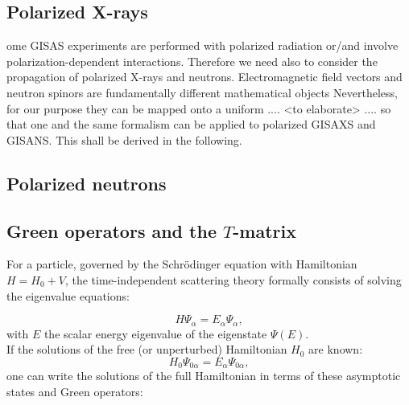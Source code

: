 \subsection{Polarized X-rays}


ome GISAS experiments are performed with polarized radiation
or/and involve polarization-dependent interactions.
Therefore we need also to consider
the propagation of polarized X-rays and neutrons.
Electromagnetic field vectors and neutron spinors
are fundamentally different mathematical objects
Nevertheless, for our purpose they can be
mapped onto a uniform .... <to elaborate> ....
so that one and the same formalism can be applied
to polarized GISAXS and GISANS.
This shall be derived in the following.


\subsection{Polarized neutrons}



\subsection{Green operators and the $T$-matrix}
  \label{sec:BornT}

For a particle, governed by the Schr\"odinger equation with Hamiltonian $H = H_0 + V$, the time-independent scattering theory formally consists of solving the eigenvalue equations:

\begin{equation*}
  H\Psi_\alpha = E_\alpha\Psi_\alpha,
\end{equation*}
with $E$ the scalar energy eigenvalue of the eigenstate $\Psi(E)$.\\
If the solutions of the free (or unperturbed) Hamiltonian $H_0$ are known:
\begin{equation*}
  H_0\Psi_{0\alpha} = E_\alpha\Psi_{0\alpha},
\end{equation*}
one can write the solutions of the full Hamiltonian in terms of these asymptotic states and Green operators:

